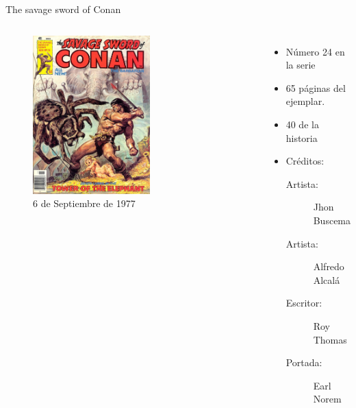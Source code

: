 \begin{frame}{The savage sword of Conan}
\begin{columns}
    \begin{figure}[htb]
    \centering
        \includegraphics[width=0.6\textwidth]{img/TSSC24Portada}
        \caption{6 de Septiembre de 1977}
    \end{figure}    
    \begin{itemize}
         \item Número 24 en la serie
         \item 65 páginas del ejemplar.
         \item 40 de la historia
         \item Créditos:
         \begin{description}
            \item[Artista:] Jhon Buscema
            \item[Artista:] Alfredo Alcalá
            \item[Escritor:] Roy Thomas
            \item[Portada:] Earl Norem
         \end{description}
    \end{itemize}
\end{columns}
\end{frame}

